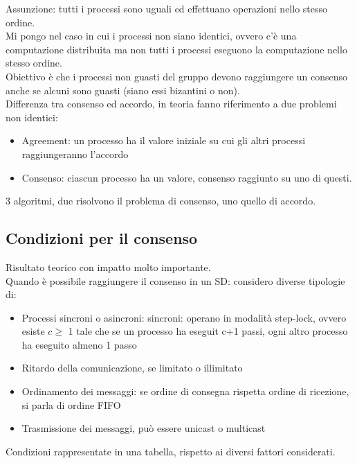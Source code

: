 \documentclass{article}
\begin{document}
Assunzione: tutti i processi sono uguali ed effettuano operazioni nello stesso ordine.\\ Mi pongo nel caso in cui i processi non siano identici, ovvero c'è una computazione distribuita ma non tutti i processi eseguono la computazione nello stesso ordine.\\ Obiettivo è che i processi non guasti del gruppo devono raggiungere un consenso anche se alcuni sono guasti (siano essi bizantini o non).\\ Differenza tra consenso ed accordo, in teoria fanno riferimento a due problemi non identici:
\begin{itemize}
\item Agreement: un processo ha il valore iniziale su cui gli altri processi raggiungeranno l'accordo
\item Consenso: ciascun processo ha un valore, consenso raggiunto su uno di questi.
\end{itemize}
3 algoritmi, due risolvono il problema di consenso, uno quello di accordo.
\subsection{Condizioni per il consenso}
Risultato teorico con impatto molto importante.\\ Quando è possibile raggiungere il consenso in un SD: considero diverse tipologie di:
\begin{itemize}
\item Processi sincroni o asincroni: sincroni: operano in modalità step-lock, ovvero esiste $c \geq$ 1 tale che se un processo ha eseguit c+1 passi, ogni altro processo ha eseguito almeno 1 passo
\item Ritardo della comunicazione, se limitato o illimitato
\item Ordinamento dei messaggi: se ordine di consegna rispetta ordine di ricezione, si parla di ordine FIFO
\item Trasmissione dei messaggi, può essere unicast o multicast
\end{itemize}
Condizioni rappresentate in una tabella, rispetto ai diversi fattori considerati. 
\end{document}
